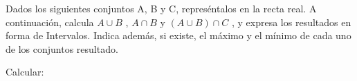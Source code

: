\documentclass[addpoints,spanish, 12pt,a4paper]{exam}
\begin{document}
        \begin{questions}
        \question Dados los siguientes conjuntos A, B y C, represéntalos en la recta real. A continuación, calcula $A \cup  B$ , $A \cap B$ y $(A \cup B) \cap C$ , 
y expresa los resultados en forma de Intervalos. 
Indica además, si existe, el máximo y el mínimo de cada uno de los conjuntos resultado.
        \begin{multicols}{1}
        \begin{parts} \part[1]  $ A=\left\{ x \in \mathbb{R}| -4 \leq x \wedge x \leq 0 \right\}, \\ B=\left(-\infty, -1\right) \cup \left(1, \infty\right)  y \\  C=\left\{ x \in \mathbb{R}| \left|{x - 2}\right|\leq3 \right\} \\ $  \begin{solution}  $ C=\left[-1, 5\right] \ \ A \cup  B = \left(-\infty, 0\right] \cup \left(1, \infty\right)  \\  A \cap B= \left[-4, -1\right)   \\  (A \cup B) \cap C= \left[-1, 0\right] \cup \left(1, 5\right] $  \end{solution}
        \end{parts}
        \end{multicols}
        \question Calcular:
        \begin{multicols}{1}
        \end{multicols}

\end{questions}
\end{document}
